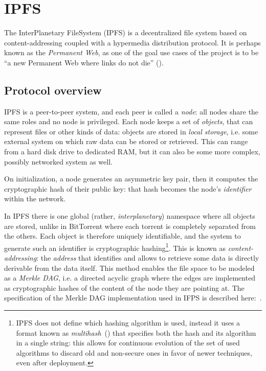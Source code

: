 \documentclass[mscthesis]{usiinfthesis}
\begin{document}
\section{IPFS}\label{proj:ipfs}

The InterPlanetary FileSystem (IPFS) is a decentralized file system based on content-addressing coupled with a hypermedia distribution protocol. It is perhaps known as the \textit{Permanent Web}, as one of the goal use cases of the project is to be ``a new Permanent Web where links do not die'' (\cite{benet2014ipfs}).

\subsection{Protocol overview}

IPFS is a peer-to-peer system, and each peer is called a \emph{node}: all nodes share the same roles and no node is privileged. Each node keeps a set of \emph{objects}, that can represent files or other kinds of data: objects are stored in \emph{local storage}, i.e. some external system on which raw data can be stored or retrieved. This can range from a hard disk drive to dedicated RAM, but it can also be some more complex, possibly networked system as well.

On initialization, a node generates an asymmetric key pair, then it computes the cryptographic hash of their public key: that hash becomes the node's \emph{identifier} within the network.

In IPFS there is one global (rather, \textit{interplanetary}) namespace where all objects are stored, unlike in BitTorrent where each torrent is completely separated from the others. Each object is therefore uniquely identifiable, and the system to generate such an identifier is cryptographic hashing\footnote{IPFS does not define which hashing algorithm is used, instead it uses a format known as \emph{multihash}~(\cite{multihash}) that specifies both the hash and its algorithm in a single string: this allows for continuous evolution of the set of used algorithms to discard old and non-secure ones in favor of newer techniques, even after deployment.}. This is known as \emph{content-addressing}: the \textit{address} that identifies and allows to retrieve some data is directly derivable from the data itself. This method enables the file space to be modeled as a \textit{Merkle DAG}, i.e. a directed acyclic graph where the edges are implemented as cryptographic hashes of the content of the node they are pointing at. The specification of the Merkle DAG implementation used in IFPS is described here:~\cite{website:ipfsmerkledag}.
\end{document}

